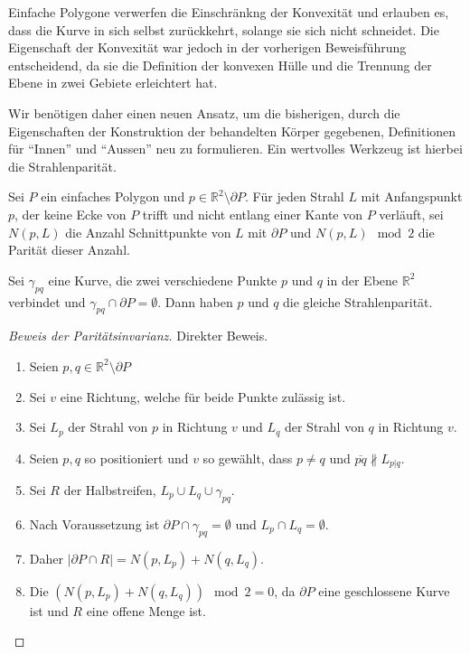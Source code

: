 Einfache Polygone verwerfen die Einschränkng der Konvexität und erlauben es, dass die Kurve in sich selbst zurückkehrt, solange sie sich nicht schneidet. 
Die Eigenschaft der Konvexität war jedoch in der vorherigen Beweisführung entscheidend, da sie die Definition der konvexen Hülle und die Trennung der Ebene in zwei Gebiete erleichtert hat. 

Wir benötigen daher einen neuen Ansatz, um die bisherigen, durch die Eigenschaften der Konstruktion der behandelten Körper gegebenen, Definitionen für ``Innen'' und ``Aussen'' neu zu formulieren. Ein wertvolles Werkzeug ist hierbei die Strahlenparität.

\begin{definition}[Strahlenparität]
    Sei $P$ ein einfaches Polygon und $p \in \mathbb{R}^2 \setminus \partial P$.
    Für jeden Strahl $L$ mit Anfangspunkt $p$, der keine Ecke von $P$ trifft und nicht entlang einer Kante von $P$ verläuft, sei $N(p,L)$ die Anzahl Schnittpunkte von $L$ mit $\partial P$ 
    und $N(p,L) \mod 2$ die Parität dieser Anzahl.
\end{definition}

\begin{lemma}
    Sei $\gamma_{pq}$ eine Kurve, die zwei verschiedene Punkte $p$ und $q$ in der Ebene $\mathbb{R}^2$ verbindet und $\gamma_{pq} \cap \partial P = \emptyset$.  
    Dann haben $p$ und $q$ die gleiche Strahlenparität.
\end{lemma}

\begin{proof}[Beweis der Paritätsinvarianz]
    Direkter Beweis.
    \begin{enumerate}
        \item Seien $p,q \in \mathbb{R}^2 \setminus \partial P$
        \item Sei $v$ eine Richtung, welche für beide Punkte zulässig ist.
        \item Sei $L_p$ der Strahl von $p$ in Richtung $v$ und $L_q$ der Strahl von $q$ in Richtung $v$.
        \item Seien $p,q$ so positioniert und $v$ so gewählt, dass $p \neq q$ und $\overline{pq} \nparallel L_{p | q}$.
        \item Sei $R$ der Halbstreifen, $L_p \cup L_q \cup \gamma_{pq}$.
        \item Nach Voraussetzung ist $\partial P \cap \gamma_{pq} = \emptyset$ und $L_p \cap L_q = \emptyset$.
        \item Daher $\left| \partial P \cap R \right| = N(p,L_p) + N(q,L_q)$.
        \item Die $\left(N(p,L_p) + N(q,L_q)\right) \mod 2 = 0$, da $\partial P$ eine geschlossene Kurve ist und $R$ eine offene Menge ist.
    \end{enumerate}
\end{proof}

